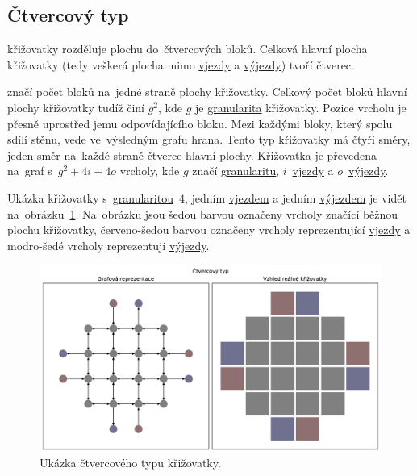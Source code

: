 \subsection{Čtvercový typ}\label{subsec:ctvercovy_typ}

 křižovatky rozděluje plochu do~čtvercových bloků.
Celková hlavní plocha křižovatky (tedy veškerá plocha mimo
\hyperref[par:vjezdy]{vjezdy} a \hyperref[par:vyjezdy]{výjezdy}) tvoří čtverec.

 značí počet bloků na~jedné straně plochy křižovatky.
Celkový počet bloků hlavní plochy křižovatky tudíž činí $g^2$, kde $g$ je \hyperref[par:granularita]{granularita} křižovatky.
Pozice vrcholu je přesně uprostřed jemu odpovídajícího bloku.
Mezi každými bloky, který spolu sdílí stěnu, vede ve~výsledným grafu hrana.
Tento typ křižovatky má čtyři směry, jeden směr na~každé straně čtverce hlavní plochy.
Křižovatka je převedena na~graf s~$g^2 + 4i + 4o$ vrcholy,
kde $g$ značí \hyperref[par:granularita]{granularitu}, $i$~\hyperref[par:vjezdy]{vjezdy} a $o$~\hyperref[par:vyjezdy]{výjezdy}.

Ukázka křižovatky s~\hyperref[par:granularita]{granularitou}~$4$, jedním \hyperref[par:vjezdy]{vjezdem} a
jedním \hyperref[par:vyjezdy]{výjezdem} je vidět na~obrázku~\ref{fig:square_type_graph}.
Na~obrázku jsou šedou barvou označeny vrcholy značící běžnou plochu křižovatky,
červeno-šedou barvou označeny vrcholy reprezentující \hyperref[par:vjezdy]{vjezdy} a
modro-šedé vrcholy reprezentují \hyperref[par:vyjezdy]{výjezdy}.

\begin{figure}[h]
	\centering
	\includegraphics[width=\textwidth]{../img/Square_grid}
	\caption{Ukázka čtvercového typu křižovatky.}
	\label{fig:square_type_graph}
\end{figure}

